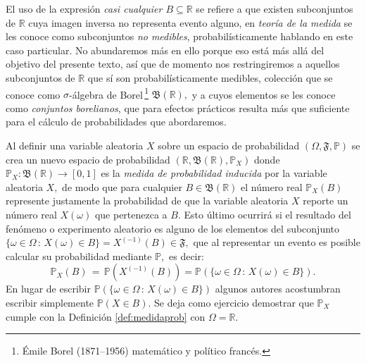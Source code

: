 \documentclass[spanish,10pt,letterpaper]{article}
\newcommand{\prob}{\mathbb{P}}
\newcommand{\Runo}{\mathbb{R}}
\begin{document}
	El uso de la expresión \textit{casi cualquier $B\subseteq\Runo$} se refiere a que existen subconjuntos de $\Runo$ cuya imagen inversa no representa evento alguno, en \textit{teoría de la medida} se les conoce como subconjuntos \textit{no medibles}, probabilísticamente hablando en este caso particular. No abundaremos más en ello porque eso está más allá del objetivo del presente texto, así que de momento nos restringiremos a aquellos subconjuntos de $\Runo$ que sí son probabilísticamente medibles, colección que se conoce como $\sigma$-álgebra de Borel\,\footnote{Émile Borel (1871--1956) matemático y político francés.} $\mathfrak{B}(\Runo),$ y a cuyos elementos se les conoce como \textit{conjuntos borelianos}, que para efectos prácticos resulta más que suficiente para el cálculo de probabilidades que abordaremos.
	
	\medskip 
	
	Al definir una variable aleatoria $X$ sobre un espacio de probabilidad $(\Omega,\mathfrak{F},\prob)$ se crea un nuevo espacio de probabilidad $(\Runo, \mathfrak{B}(\Runo),\prob_X)$ donde $\prob_X:\mathfrak{B}(\Runo)\rightarrow[0,1]$ es la \textit{medida de probabilidad inducida} por la variable aleatoria $X,$ de modo que para cualquier $B\in\mathfrak{B}(\Runo)$ el número real $\prob_X(B)$ represente justamente la probabilidad de que la variable aleatoria $X$ reporte un número real $X(\omega)$ que pertenezca a $B.$ Esto último ocurrirá si el resultado del fenómeno o experimento aleatorio es alguno de los elementos del subconjunto $\{\omega\in\Omega\,:\,X(\omega)\in B\}=X^{(-1)}(B)\in\mathfrak{F},$ que al representar un evento es posible calcular su probabilidad mediante $\prob,$ es decir:
	\begin{equation}\label{eq:medidainducida}
		\prob_X(B) \,=\, \prob(X^{(-1)}(B)) = \prob\left(\{\omega\in\Omega\,:\,X(\omega)\in B\}\right).
	\end{equation}
	En lugar de escribir $\prob\left(\{\omega\in\Omega\,:\,X(\omega)\in B\}\right)$ algunos autores acostumbran escribir simplemente $\prob(X\in B).$ Se deja como ejercicio demostrar que $\prob_X$ cumple con la Definición \ref{def:medidaprob} con $\Omega=\Runo.$
	
	\bigskip 
	
\end{document}
